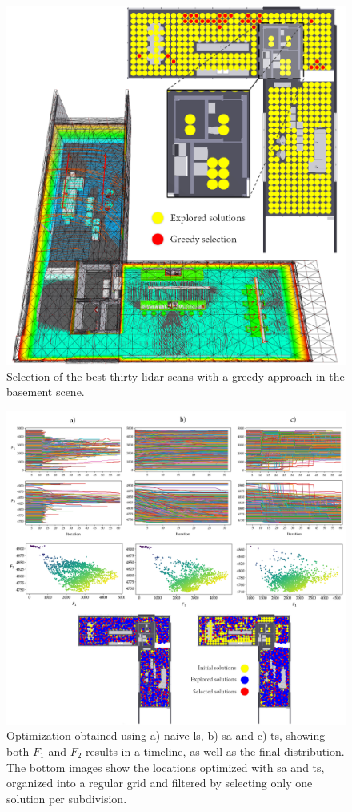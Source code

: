 \begin{figure}
    \centering
    \includegraphics[width=.8\linewidth]{figs/lidar_optimization/greedy_results.png}
	\caption{Selection of the best thirty \acrshort{lidar} scans with a greedy approach in the basement scene.}
	\label{fig:greedy_results}
\end{figure}

\begin{figure}
    \centering
    \includegraphics[width=.85\linewidth]{figs/lidar_optimization/local_search_results.png}
	\caption{Optimization obtained using a) naive \acrshort{ls}, b) \acrshort{sa} and c) \acrshort{ts}, showing both $F_1$ and $F_2$ results in a timeline, as well as the final distribution. The bottom images show the locations optimized with \acrshort{sa} and \acrshort{ts}, organized into a regular grid and filtered by selecting only one solution per subdivision.}
	\label{fig:local_search_results}
\end{figure}

